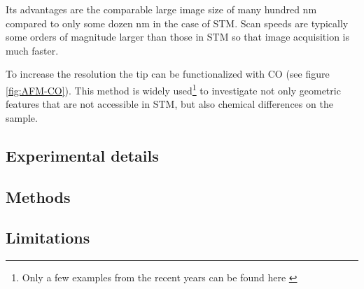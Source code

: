 Its advantages are the comparable large image size of many hundred \si{\nm} compared to only some dozen \si{\nm} in the case of STM. Scan speeds are typically some orders of magnitude larger than those in STM so that image acquisition is much faster.

To increase the resolution the tip can be functionalized with CO (see figure \ref{fig:AFM-CO}). This method is widely used\footnote{Only a few examples from the recent years can be found here \cite{albrecht_direct_2016, kawai_multiple_2018, kawai_atomically_2015, schulz_elemental_2018, gross_chemical_2009, pavlicek_generation_2017, schwarz_corrugation_2017}} to investigate not only geometric features that are not accessible in STM, but also chemical differences on the sample\cite{wang_exploration_20170}.

\subsection{Experimental details}
\subsection{Methods}
\subsection{Limitations}